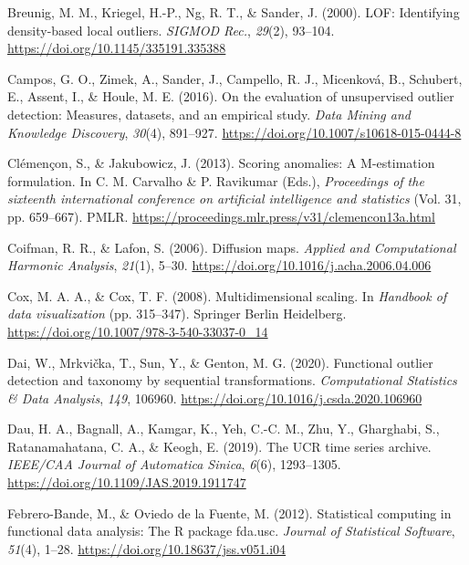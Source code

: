 \documentclass[
  10pt]{article}
\newlength{\cslhangindent}
\newlength{\cslentryspacingunit} %
\newenvironment{CSLReferences}[2] %
 {%
  \setlength{\parindent}{0pt}
  \ifodd #1
  \let\oldpar\par
  \def\par{\hangindent=\cslhangindent\oldpar}
  \fi
  \setlength{\parskip}{#2\cslentryspacingunit}
 }%
 {}
\begin{document}
\begin{CSLReferences}{1}{0}
\leavevmode{}%
Breunig, M. M., Kriegel, H.-P., Ng, R. T., \& Sander, J. (2000). {LOF}: Identifying density-based local outliers. \emph{SIGMOD Rec.}, \emph{29}(2), 93--104. \url{https://doi.org/10.1145/335191.335388}

\leavevmode{}%
Campos, G. O., Zimek, A., Sander, J., Campello, R. J., Micenková, B., Schubert, E., Assent, I., \& Houle, M. E. (2016). On the evaluation of unsupervised outlier detection: Measures, datasets, and an empirical study. \emph{Data Mining and Knowledge Discovery}, \emph{30}(4), 891--927. \url{https://doi.org/10.1007/s10618-015-0444-8}

\leavevmode{}%
Clémençon, S., \& Jakubowicz, J. (2013). Scoring anomalies: A {M}-estimation formulation. In C. M. Carvalho \& P. Ravikumar (Eds.), \emph{Proceedings of the sixteenth international conference on artificial intelligence and statistics} (Vol. 31, pp. 659--667). PMLR. \url{https://proceedings.mlr.press/v31/clemencon13a.html}

\leavevmode{}%
Coifman, R. R., \& Lafon, S. (2006). Diffusion maps. \emph{Applied and Computational Harmonic Analysis}, \emph{21}(1), 5--30. \url{https://doi.org/10.1016/j.acha.2006.04.006}

\leavevmode{}%
Cox, M. A. A., \& Cox, T. F. (2008). Multidimensional scaling. In \emph{Handbook of data visualization} (pp. 315--347). Springer Berlin Heidelberg. \url{https://doi.org/10.1007/978-3-540-33037-0_14}

\leavevmode{}%
Dai, W., Mrkvička, T., Sun, Y., \& Genton, M. G. (2020). Functional outlier detection and taxonomy by sequential transformations. \emph{Computational Statistics \& Data Analysis}, \emph{149}, 106960. \url{https://doi.org/10.1016/j.csda.2020.106960}

\leavevmode{}%
Dau, H. A., Bagnall, A., Kamgar, K., Yeh, C.-C. M., Zhu, Y., Gharghabi, S., Ratanamahatana, C. A., \& Keogh, E. (2019). The {UCR} time series archive. \emph{IEEE/CAA Journal of Automatica Sinica}, \emph{6}(6), 1293--1305. \url{https://doi.org/10.1109/JAS.2019.1911747}

\leavevmode{}%
Febrero-Bande, M., \& Oviedo de la Fuente, M. (2012). Statistical computing in functional data analysis: The {R} package {fda.usc}. \emph{Journal of Statistical Software}, \emph{51}(4), 1--28. \url{https://doi.org/10.18637/jss.v051.i04}


\end{CSLReferences}
\end{document}
